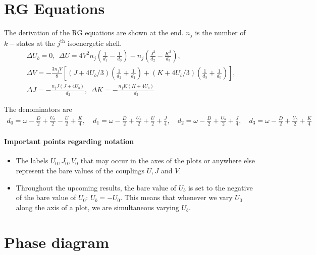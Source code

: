 \documentclass{report}
\numberwithin{equation}{section}
\begin{document}
\section{RG Equations}
The derivation of the RG equations are shown at the end. \(n_j\) is the number of \(k-\)states at the \(j^\text{th}\) isoenergetic shell. 
\begin{gather}
	\Delta U_b = 0, ~ ~\Delta U = 4V^2 n_j\left(\frac{1}{d_1} - \frac{1}{d_0}\right) - n_j\left(\frac{J^2}{d_2} - \frac{K^2}{d_3}\right),\\
	\Delta V = -\frac{3n_j V}{8}\left[\left(J + 4U_b/3\right) \left(\frac{1}{d_2} + \frac{1}{d_1}\right) + \left(K + 4U_b/3\right)\left(\frac{1}{d_3} + \frac{1}{d_0}\right)\right],\\
	\Delta J = -\frac{n_j J\left(J + 4U_b\right)}{d_2},~ ~\Delta K = -\frac{n_j K\left(K + 4U_b\right)}{d_3}
\end{gather}

The denominators are
\begin{equation}\begin{aligned}
	d_0 = \omega - \frac{D}{2} + \frac{U_b}{2} - \frac{U}{2} + \frac{K}{4}, \quad d_1 = \omega - \frac{D}{2} + \frac{U_b}{2} + \frac{U}{2} + \frac{J}{4}, \quad d_2 = \omega - \frac{D}{2} + \frac{U_b}{2} + \frac{J}{4}, \quad d_3 = \omega - \frac{D}{2} + \frac{U_b}{2} + \frac{K}{4}
\end{aligned}\end{equation}

\paragraph{Important points regarding notation}
\begin{itemize}
	\item The labels \(U_0,J_0,V_0\) that may occur in the axes of the plots or anywhere else represent the bare values of the couplings \(U,J\) and \(V\). 
	\item Throughout the upcoming results, the bare value of \(U_b\) is set to the negative of the bare value of \(U_0\): \(U_b = -U_0\). This means that whenever we vary \(U_0\) along the axis of a plot, we are simultaneous varying \(U_b\).	
\end{itemize}

\section{Phase diagram}
\end{document}
